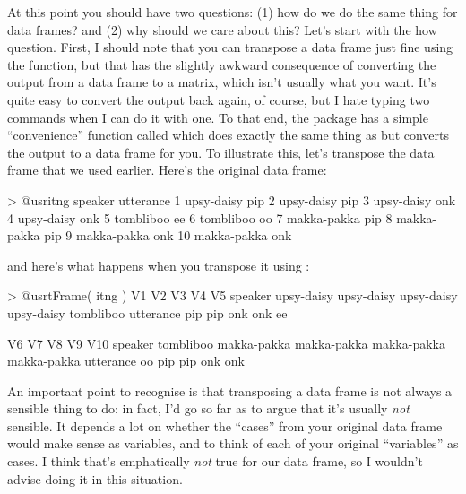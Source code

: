 At this point you should have two questions: (1) how do we do the same thing for data frames? and (2) why should we care about this? Let's start with the how question. First, I should note that you can transpose a data frame just fine using the  function, but that has the slightly awkward consequence of converting the output from a data frame to a matrix, which isn't usually what you want. It's quite easy to convert the output back again, of course, but I hate typing two commands when I can do it with one. To that end, the  package has a simple ``convenience'' function called  which does exactly the same thing as  but converts the output to a data frame for you. To illustrate this, let's transpose the  data frame that we used earlier. Here's the original data frame:
\begin{rblock1}
> @usr{itng}
       speaker utterance
1   upsy-daisy       pip
2   upsy-daisy       pip
3   upsy-daisy       onk
4   upsy-daisy       onk
5    tombliboo        ee
6    tombliboo        oo
7  makka-pakka       pip
8  makka-pakka       pip
9  makka-pakka       onk
10 makka-pakka       onk
\end{rblock1}
and here's what happens when you transpose it using :
\begin{rblock1}
> @usr{tFrame( itng )}
                  V1         V2         V3         V4        V5
speaker   upsy-daisy upsy-daisy upsy-daisy upsy-daisy tombliboo
utterance        pip        pip        onk        onk        ee

                 V6          V7          V8          V9         V10
speaker   tombliboo makka-pakka makka-pakka makka-pakka makka-pakka
utterance        oo         pip         pip         onk         onk
\end{rblock1}
An important point to recognise is that transposing a data frame is not always a sensible thing to do: in fact, I'd go so far as to argue that it's usually {\it not} sensible. It depends a lot on whether the ``cases'' from your original data frame would make sense as variables, and to think of each of your original ``variables'' as cases. I think that's emphatically {\it not} true for our  data frame, so I wouldn't advise doing it in this situation. 

